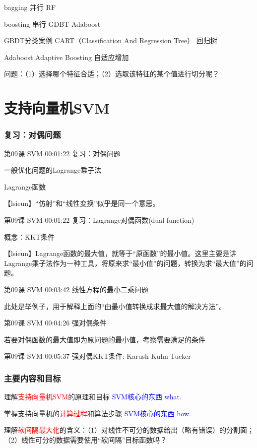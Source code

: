 \documentclass[UTF8]{ctexbook}
\begin{document}
bagging 并行 RF

boosting 串行 GDBT Adaboost

GBDT分类案例   CART（Classification And Regression Tree） 回归树


Adaboost Adaptive Boosting 自适应增加

问题：（1）选择哪个特征合适；（2）选取该特征的某个值进行切分呢？





\chapter{支持向量机SVM}

\subsection{复习：对偶问题}


第09课 SVM 00:01:22 复习：对偶问题

一般优化问题的Lagrange乘子法

Lagrange函数

【lsieun】“仿射”和“线性变换”似乎是同一个意思。

第09课 SVM 00:01:22 复习：Lagrange对偶函数(dual function)

概念：KKT条件

【lsieun】Lagrange函数的最大值，就等于“原函数”的最小值。这里主要是讲Lagrange乘子法作为一种工具，将原来求“最小值”的问题，转换为求“最大值”的问题。

第09课 SVM 00:03:42 线性方程的最小二乘问题

此处是举例子，用于解释上面的“由最小值转换成求最大值的解决方法”。

第09课 SVM 00:04:26 强对偶条件

若要对偶函数的最大值即为原问题的最小值，考察需要满足的条件

第09课 SVM 00:05:37 强对偶KKT条件: Karush-Kuhn-Tucker

\subsection{主要内容和目标}

理解\textcolor{red}{支持向量机SVM}的原理和目标  \textcolor{blue}{SVM核心的东西 what}.

掌握支持向量机的\textcolor{red}{计算过程}和算法步骤  \textcolor{blue}{SVM核心的东西 how}.

理解\textcolor{red}{软间隔最大化}的含义：（1）对线性不可分的数据给出（略有错误）的分割面；（2）线性可分的数据需要使用“软间隔”目标函数吗？
\end{document}
